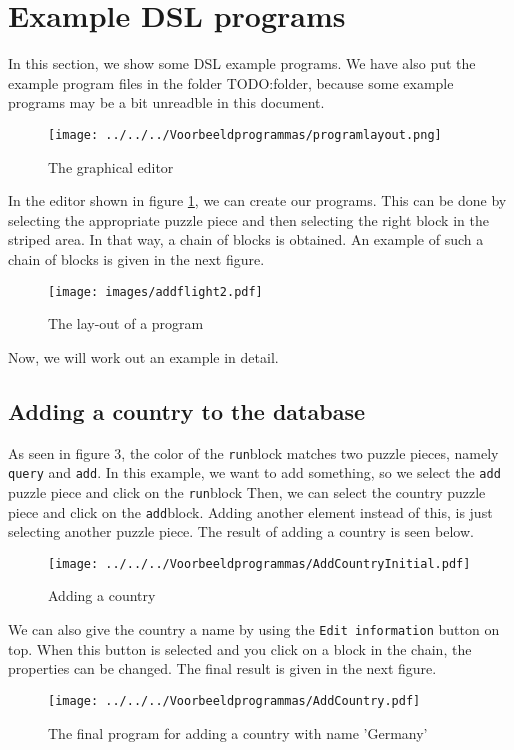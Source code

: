 
\section{Example DSL programs}
In this section, we show some DSL example programs. We have also put the example program files in the folder TODO:folder, because some example programs may be a bit unreadble in this document.

\begin{figure}[H]
	\centering
	\texttt{[image: ../../../Voorbeeldprogrammas/programlayout.png]}
	\caption{The graphical editor}
	\label{ex:DSLlayout}
\end{figure}
\noindent In the editor shown in figure \ref{ex:DSLlayout}, we can create our programs. This can be done by selecting the appropriate puzzle piece and then selecting the right block in the striped area. In that way, a chain of blocks is obtained. An example of such a chain of blocks is given in the next figure.
\begin{figure}[H]
	\centering
	\texttt{[image: images/addflight2.pdf]}
	\caption{The lay-out of a program}
	\label{ex:generalexample}
\end{figure}
Now, we will work out an example in detail.

\subsection{Adding a country to the database}
As seen in figure 3, the color of the \texttt{run}block matches two puzzle pieces, namely \texttt{query} and \texttt{add}.
In this example, we want to add something, so we select the \texttt{add} puzzle piece and click on the \texttt{run}block Then, we can select the country puzzle piece and click on the \texttt{add}block. Adding another element instead of this, is just selecting another puzzle piece. The result of adding a country is seen below.
\begin{figure}[H]
	\centering
	\texttt{[image: ../../../Voorbeeldprogrammas/AddCountryInitial.pdf]}
	\caption{Adding a country}
	\label{ex:addCountryInitial}
\end{figure}
\noindent We can also give the country a name by using the \texttt{Edit information} button on top. When this button is selected and you click on a block in the chain, the properties can be changed. The final result is given in the next figure.
\begin{figure}[H]
	\centering
	\texttt{[image: ../../../Voorbeeldprogrammas/AddCountry.pdf]}
	\caption{The final program for adding a country with name 'Germany'}
	\label{ex:addCountry}
\end{figure}

